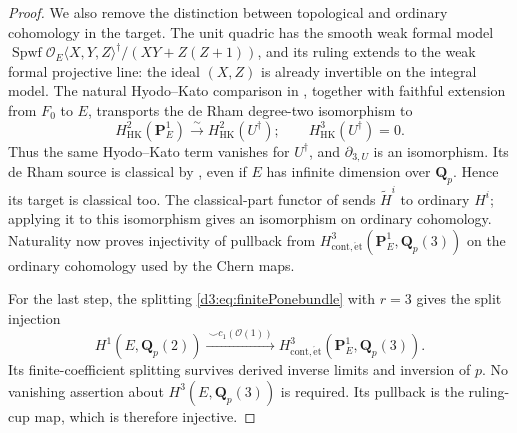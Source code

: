\documentclass[11pt,a4paper]{amsart}
\numberwithin{equation}{section}
\theoremstyle{definition}
\theoremstyle{remark}
\newcommand{\Q}{\mathbf Q}
\newcommand{\PP}{\mathbf P}
\newcommand{\OO}{\mathcal O}
\begin{document}
\begin{proof}
We also remove the distinction between topological and ordinary
cohomology in the target. The unit quadric has the smooth weak formal
model
$\operatorname{Spwf}\OO_E\langle X,Y,Z\rangle^\dagger/
(XY+Z(Z+1))$, and its ruling extends to the weak formal projective
line: the ideal $(X,Z)$ is already invertible on the integral model.
The natural Hyodo--Kato comparison in
\cite[equation~(5.4) and the following strict quasi-isomorphism,
Propositions~5.5--5.6]{ColmezNiziol}, together with faithful extension
from $F_0$ to $E$, transports the de Rham degree-two isomorphism to
\[
 H^2_{\mathrm{HK}}(\PP^1_E)
       \xrightarrow{\sim}H^2_{\mathrm{HK}}(U^\dagger);
 \qquad H^3_{\mathrm{HK}}(U^\dagger)=0.
\]
Thus the same Hyodo--Kato term vanishes for $U^\dagger$, and
$\partial_{3,U}$ is an isomorphism.
Its de Rham source is classical by
\cite[Section~5.1]{ColmezNiziol}, even if $E$ has infinite dimension
over $\Q_p$. Hence its target is classical too.
The classical-part functor of \cite[Section~3.1.1]{ColmezNiziol}
sends $\widetilde H^i$ to ordinary $H^i$; applying it to this
isomorphism gives an isomorphism on ordinary cohomology.
Naturality now proves injectivity of pullback from
$H^3_{\mathrm{cont},\mathrm{\acute et}}(\PP^1_E,\Q_p(3))$ on the
ordinary cohomology used by the Chern maps.

For the last step, the splitting \eqref{d3:eq:finitePonebundle}
with $r=3$ gives the split injection
\[
 H^1(E,\Q_p(2))
 \xrightarrow{\ \smile c_1(\OO(1))\ }
 H^3_{\mathrm{cont},\mathrm{\acute et}}(\PP^1_E,\Q_p(3)).
\]
Its finite-coefficient splitting survives derived inverse limits and
inversion of $p$. No vanishing assertion about
$H^3(E,\Q_p(3))$ is required.
Its pullback is the ruling-cup map, which is therefore
injective.
\end{proof}
\end{document}
